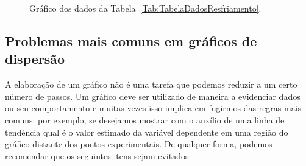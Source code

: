 \begin{figure*}[!htb]
\centering
\caption{Gráfico dos dados da Tabela~\ref{Tab:TabelaDadosResfriamento}.}
\label{Fig:GraficoResfriamento}

\end{figure*}

\subsection{Problemas mais comuns em gráficos de dispersão}

A elaboração de um gráfico não é uma tarefa que podemos reduzir a um certo número de passos. Um gráfico deve ser utilizado de maneira a evidenciar dados ou seu comportamento e muitas vezes isso implica em fugirmos das regras mais comuns: por exemplo, se desejamos mostrar com o auxílio de uma linha de tendência qual é o valor estimado da variável dependente em uma região do gráfico distante dos pontos experimentais. De qualquer forma, podemos recomendar que os seguintes itens sejam evitados:
